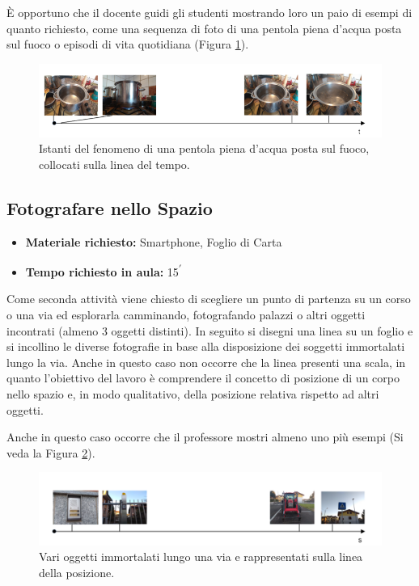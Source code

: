 \documentclass{report} \usepackage[T1]{fontenc} \usepackage[italian]{babel}
\begin{document}
\`E opportuno che il docente guidi gli studenti mostrando loro un paio di esempi
di quanto richiesto, come una sequenza di foto di una pentola piena d’acqua
posta sul fuoco o episodi di vita quotidiana (Figura \ref{fig:asse_t_pentola}).
\begin{figure}[H]
\centering
  \includegraphics[width=\textwidth]{asse_t_pentola}
  \caption{Istanti del fenomeno di una pentola piena d'acqua posta sul fuoco,
           collocati sulla linea del tempo.}
  \label{fig:asse_t_pentola}
\end{figure}

\subsection{Fotografare nello Spazio}

\begin{itemize}
\item \textbf{Materiale richiesto:} Smartphone, Foglio di Carta
\item \textbf{Tempo richiesto in aula:} 15\textsuperscript{$\prime$}
\end{itemize}

Come seconda attività viene chiesto di scegliere un punto di partenza su un
corso o una via ed esplorarla camminando, fotografando palazzi o altri oggetti
incontrati (almeno 3 oggetti distinti). In seguito si disegni una linea su un
foglio e si incollino le diverse fotografie in base alla disposizione dei
soggetti immortalati lungo la via. Anche in questo caso non occorre che la
linea presenti una scala, in quanto l’obiettivo del lavoro è comprendere il
concetto di posizione di un corpo nello spazio e, in modo qualitativo, della
posizione relativa rispetto ad altri oggetti.

Anche in questo caso occorre che il professore mostri almeno uno più esempi
(Si veda la Figura \ref{fig:asse_s}).
\begin{figure}[H]
\centering
  \includegraphics[width=\textwidth]{asse_s}
  \caption{Vari oggetti immortalati lungo una via e rappresentati
           sulla linea della posizione.}
  \label{fig:asse_s}
\end{figure}
\end{document}
